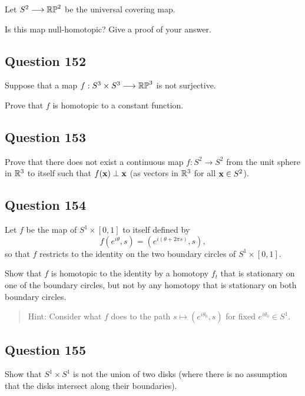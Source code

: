 \documentclass[12pt]{article}
\begin{document}
Let \(S^2 \longrightarrow {\mathbb{RP}}^2\) be the universal covering map.

Is this map null-homotopic? Give a proof of your answer.

\hypertarget{question-152}{%
\subsection{Question 152}\label{question-152}}

Suppose that a map \(f : S^3 \times S^3 \longrightarrow {\mathbb{RP}}^3\) is not surjective.

Prove that \(f\) is homotopic to a constant function.

\hypertarget{question-153}{%
\subsection{Question 153}\label{question-153}}

Prove that there does not exist a continuous map \(f : S^2 \to S^2\)
from the unit sphere in \({\mathbb{R}}^3\) to itself such that
\(f (\mathbf{x}) \perp \mathbf{x}\) (as vectors in \({\mathbb{R}}^3\) for all
\(\mathbf{x} \in S^2\)).

\hypertarget{question-154}{%
\subsection{Question 154}\label{question-154}}

Let \(f\) be the map of \(S^1 \times [0, 1]\) to itself defined by \[
f (e^{i\theta} , s) = (e^{i(\theta+2\pi s)} , s)
,\] so that \(f\) restricts to the identity on the two boundary circles
of \(S^1 \times [0, 1]\).

Show that \(f\) is homotopic to the identity by a homotopy \(f_t\) that
is stationary on one of the boundary circles, but not by any homotopy
that is stationary on both boundary circles.

\begin{quote}
Hint: Consider what \(f\) does to the path
\(s \mapsto (e^{i\theta_0} , s)\) for fixed \(e^{i\theta_0} \in S^1\).
\end{quote}

\hypertarget{question-155}{%
\subsection{Question 155}\label{question-155}}

Show that \(S^1 \times S^1\) is not the union of two disks (where there
is no assumption that the disks intersect along their boundaries).
\end{document}
